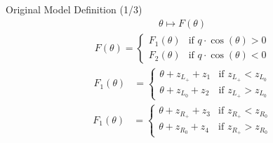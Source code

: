 \begin{frame}{Original Model Definition (1/3)}
	\begin{align}
		\theta \mapsto F(\theta)
	\end{align}
	\begin{align}
		F(\theta) = \begin{cases}
			            F_1(\theta) & \text{if } q \cdot \cos(\theta) > 0 \\
			            F_2(\theta) & \text{if } q \cdot \cos(\theta) < 0
		            \end{cases}
	\end{align}
	\begin{align}
		F_1(\theta) & = \begin{cases}
			                \theta + z_{L_+} + z_1 & \text{if } z_{L_+} < z_{L_0} \\
			                \theta + z_{L_0} + z_2 & \text{if } z_{L_+} > z_{L_0}
		                \end{cases}
	\end{align}
	\begin{align}
		F_1(\theta) & = \begin{cases}
			                \theta + z_{R_+} + z_3 & \text{if } z_{R_+} < z_{R_0} \\
			                \theta + z_{R_0} + z_4 & \text{if } z_{R_+} > z_{R_0}
		                \end{cases}
	\end{align}
\end{frame}

